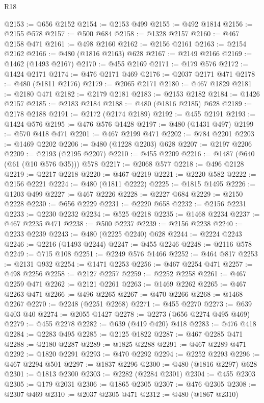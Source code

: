 \begin{lexlean}{R18}
\begin{coremodule}
@2153 := @656 @2152
@2154 := @2153 @499
@2155 := @492 @1814
@2156 := @2155 @578
@2157 := @500 @684
@2158 := @1328 @2157
@2160 := @467 @2158 @471
@2161 := @498 @2160
@2162 := @2156 @2161
@2163 := @2154 @2162
@2166 := @480 (@1816 @2163) @628
@2167 := @2149 @2166
@2169 := @1462 (@1493 @2167)
@2170 := @455 @2169
@2171 := @179 @576
@2172 := @1424 @2171
@2174 := @476 @2171 @469
@2176 := @2037 @2171 @471
@2178 := @480 (@1811 @2176)
@2179 := @2065 @2171
@2180 := @467 @1829
@2181 := @2180 @471
@2182 := @2179 @2181
@2183 := @2153 @2182
@2184 := @1426 @2157
@2185 := @2183 @2184
@2188 := @480 (@1816 @2185) @628
@2189 := @2178 @2188
@2191 := @2172 (@2174 @2189)
@2192 := @455 @2191
@2193 := @1424 @576
@2195 := @476 @576 @1428
@2197 := @480 (@1431 @497)
@2199 := @570 @418 @471
@2201 := @467 @2199 @471
@2202 := @784 @2201
@2203 := @1469 @2202
@2206 := @480 (@1228 @2203) @628
@2207 := @2197 @2206
@2209 := @2193 (@2195 @2207)
@2210 := @455 @2209
@2216 := @1487 (@640 (@61 (@10 @576 @35))) @578
@2217 := @2068 @577
@2218 := @496 @2128
@2219 := @2217 @2218
@2220 := @467 @2219
@2221 := @2220 @582
@2222 := @2156 @2221
@2224 := @480 (@1811 @2222)
@2225 := @1815 @1495
@2226 := @1203 @499
@2227 := @467 @2226
@2228 := @2227 @684
@2229 := @2150 @2228
@2230 := @656 @2229
@2231 := @2220 @658
@2232 := @2156 @2231
@2233 := @2230 @2232
@2234 := @525 @2218
@2235 := @1468 @2234
@2237 := @467 @2235 @471
@2238 := @500 @2237
@2239 := @2156 @2238
@2240 := @2233 @2239
@2243 := @480 (@2225 @2240) @628
@2244 := @2224 @2243
@2246 := @2216 (@1493 @2244)
@2247 := @455 @2246
@2248 := @2116 @578
@2249 := @715 @108
@2251 := @2249 @576 @1466
@2252 := @464 @817
@2253 := @2131 @932
@2254 := @1471 @2253
@2256 := @467 @2254 @471
@2257 := @498 @2256
@2258 := @2127 @2257
@2259 := @2252 @2258
@2261 := @467 @2259 @471
@2262 := @2121 @2261
@2263 := @1469 @2262
@2265 := @467 @2263 @471
@2266 := @496 @2265
@2267 := @470 @2266
@2268 := @1468 @2267
@2270 := @2248 (@2251 @2268)
@2271 := @455 @2270
@2273 := @639 @403 @40
@2274 := @2055 @1427
@2278 := @2273 (@656 @2274 @495 @469)
@2279 := @455 @2278
@2282 := @639 (@419 @420) @418
@2283 := @476 @418
@2284 := @2283 @495
@2285 := @2125 @1822
@2287 := @467 @2285 @471
@2288 := @2180 @2287
@2289 := @1825 @2288
@2291 := @467 @2289 @471
@2292 := @1820 @2291
@2293 := @470 @2292
@2294 := @2252 @2293
@2296 := @467 @2294 @501
@2297 := @1837 @2296
@2300 := @480 (@1816 @2297) @628
@2301 := @1813 @2300
@2303 := @2282 (@2284 @2301)
@2304 := @455 @2303
@2305 := @179 @2031
@2306 := @1865 @2305
@2307 := @476 @2305
@2308 := @2307 @469
@2310 := @2037 @2305 @471
@2312 := @480 (@1867 @2310)

\end{coremodule}
\end{lexlean}
